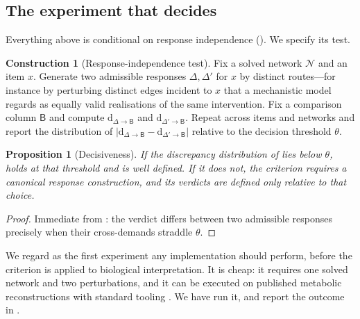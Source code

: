 \documentclass[11pt,twocolumn,a4paper]{article}
\newtheorem{proposition}[theorem]{Proposition}
\theoremstyle{definition}
\newtheorem{construction}[theorem]{Construction}
\theoremstyle{remark}
\newcommand{\dem}{\mathrm{d}}
\newcommand{\colB}{\mathsf{B}}
\newcommand{\netw}{\mathcal{N}}
\newcommand{\Perturb}{\Delta}
\begin{document}
\subsection{The experiment that decides }
\label{sec:decisive}

Everything above is conditional on response independence
(). We specify its test.

\begin{construction}[Response-independence test]
\label{con:test}
Fix a solved network $\netw$ and an item $x$. Generate two admissible
responses $\Perturb,\Perturb'$ for $x$ by distinct routes---for instance
by perturbing distinct edges incident to $x$ that a mechanistic model
regards as equally valid realisations of the same intervention. Fix a
comparison column $\colB$ and compute $\dem_{\Perturb\to\colB}$ and
$\dem_{\Perturb'\to\colB}$. Repeat across items and networks and report
the distribution of
$|\dem_{\Perturb\to\colB}-\dem_{\Perturb'\to\colB}|$ relative to the
decision threshold $\theta$.
\end{construction}

\begin{proposition}[Decisiveness]
\label{prop:decisive}
If the discrepancy distribution of  lies below $\theta$,
 holds at that threshold and  is
well defined. If it does not, the criterion requires a canonical response
construction, and its verdicts are defined only relative to that choice.
\end{proposition}

\begin{proof}
Immediate from : the verdict differs between two
admissible responses precisely when their cross-demands straddle
$\theta$.
\end{proof}

We regard  as the first experiment any implementation
should perform, before the criterion is applied to biological
interpretation. It is cheap: it requires one solved network and two
perturbations, and it can be executed on published metabolic
reconstructions \citep{kanehisa2000,jassal2020,orth2010} with standard
tooling \citep{harris2020,virtanen2020,hagberg2008}. We have run it, and
report the outcome in .
\end{document}
